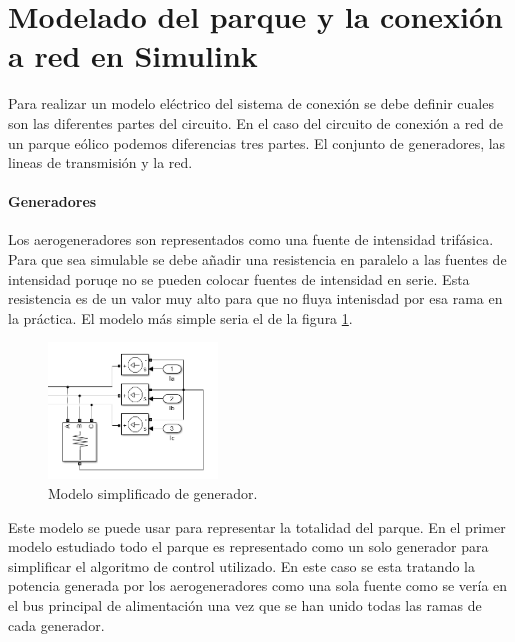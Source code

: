 \documentclass{book}
\begin{document}
	\section{Modelado del parque y la conexi\'on a red en Simulink}

Para realizar un modelo el\'ectrico del sistema de conexi\'on se debe definir cuales son las diferentes partes del circuito. En el caso del circuito de conexi\'on a red de un parque e\'olico podemos diferencias tres partes. El conjunto de generadores, las lineas de transmisi\'on y la red. \par 

		\paragraph{Generadores}

Los aerogeneradores son representados como una fuente de intensidad trif\'asica. Para que sea simulable se debe añadir una resistencia en paralelo a las fuentes de intensidad poruqe no se pueden colocar fuentes de intensidad en serie. Esta resistencia es de un valor muy alto para que no fluya intenisdad por esa rama en la pr\'actica. El modelo más simple seria el de la figura \ref{SimpleGenerator}. \par

\begin{figure}[h!]
\centering
\includegraphics[width=0.4\textwidth]{SimpleGenerator.PNG}
\caption{Modelo simplificado de generador. }
\label{SimpleGenerator}
\end{figure} \par

Este modelo se puede usar para representar la totalidad del parque. En el primer modelo estudiado todo el parque es representado como un solo generador para simplificar el algoritmo de control utilizado. En este caso se esta tratando la potencia generada por los aerogeneradores como una sola fuente como se ver\'ia en el bus principal de alimentaci\'on una vez que se han unido todas las ramas de cada generador. \par
\end{document}

